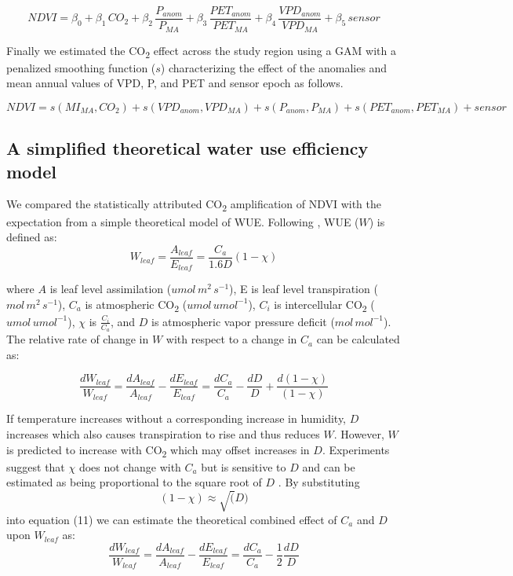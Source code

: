 \documentclass[gc, manuscript]{copernicus}
\begin{document}
\begin{equation}
NDVI=\beta_0+ \beta_1\,CO_2+\beta_2\,\frac{P_{anom}}{P_{MA}}+\beta_3\,\frac{PET_{anom}}{PET_{MA}}+\beta_4\,\frac{VPD_{anom}}{{VPD_{MA}}}+\beta_5\,sensor
\end{equation}

Finally we estimated the CO\textsubscript{2} effect across the study
region using a GAM with a penalized smoothing function (\(s\))
characterizing the effect of the anomalies and mean annual values of
VPD, P, and PET and sensor epoch as follows.

\begin{equation}
NDVI = s(MI_{MA},CO_2) + s(VPD_{anom},VPD_{MA})+s(P_{anom},P_{MA})+s(PET_{anom},PET_{MA})+sensor
\end{equation}

\subsection{A simplified theoretical water use efficiency model}

We compared the statistically attributed CO\textsubscript{2}
amplification of NDVI with the expectation from a simple theoretical
model of WUE. Following \citet{donohueImpactCOFertilization2013b}, WUE
(\(W\)) is defined as: \begin{equation}
W_{leaf} = \frac{A_{leaf}}{E_{leaf}} = \frac{C_a}{1.6D}(1 - \chi)
\end{equation}

where \(A\) is leaf level assimilation (\(umol\,m^{2}\,s^{-1}\)), E is
leaf level transpiration (\(mol\,m^{2}\,s^{-1}\)), \(C_a\) is
atmospheric CO\textsubscript{2} (\(umol\,umol^{-1}\)), \(C_i\) is
intercellular CO\textsubscript{2} (\(umol\,umol^{-1}\)), \(\chi\) is
\(\frac{C_i}{C_a}\), and \(D\) is atmospheric vapor pressure deficit
(\(mol\,mol^{-1}\)). The relative rate of change in \(W\) with respect
to a change in \(C_a\) can be calculated as:

\begin{equation}
\frac{dW_{leaf}}{W_{leaf}}=\frac{dA_{leaf}}{A_{leaf}} - \frac{dE_{leaf}}{E_{leaf}} = \frac{dC_a}{C_a} - \frac{dD}{D} + \frac{d(1-\chi)}{(1-\chi)}
\end{equation}

If temperature increases without a corresponding increase in humidity,
\(D\) increases which also causes transpiration to rise and thus reduces
\(W\). However, \(W\) is predicted to increase with CO\textsubscript{2}
which may offset increases in \(D\). Experiments suggest that \(\chi\)
does not change with \(C_a\) but is sensitive to \(D\)
\citep{wong_etal85, drake_etal97} and can be estimated as being
proportional to the square root of \(D\)
\citep{medlynReconcilingOptimalEmpirical2011d}. By substituting
\[(1-\chi) \approx \sqrt(D)\] into equation (11) we can estimate the
theoretical combined effect of \(C_a\) and \(D\) upon \(W_{leaf}\) as:
\begin{equation}
\frac{dW_{leaf}}{W_{leaf}}=\frac{dA_{leaf}}{A_{leaf}} - \frac{dE_{leaf}}{E_{leaf}} = \frac{dC_a}{C_a} - \frac{1}{2}\frac{dD}{D}
\end{equation}
\end{document}
